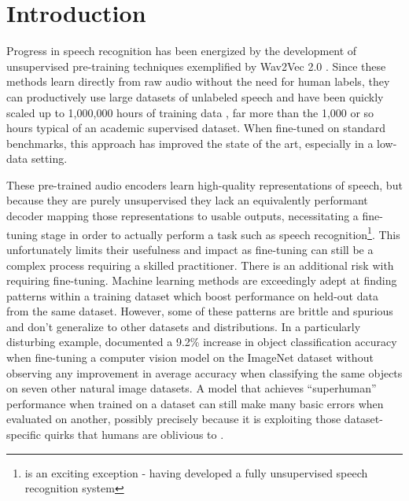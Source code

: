 \documentclass[nohyperref]{article}
\theoremstyle{plain}
\theoremstyle{definition}
\theoremstyle{remark}
\begin{document}
\begin{abstract}
We study the capabilities of speech processing systems trained simply to predict large amounts of transcripts of audio on the internet. When scaled to 680,000 hours of multilingual and multitask supervision, the resulting models generalize well to standard benchmarks and are often competitive with prior fully supervised results but in a zero-shot transfer setting without the need for any fine-tuning. When compared to humans, the models approach their accuracy and robustness. We are releasing models and inference code to serve as a foundation for further work on robust speech processing.
\end{abstract}

\section{Introduction}\label{sec:introduction}

Progress in speech recognition has been energized by the development of unsupervised pre-training techniques exemplified by Wav2Vec 2.0 \cite{baevski2020wav2vec2}. Since these methods learn directly from raw audio without the need for human labels, they can productively use large datasets of unlabeled speech and have been quickly scaled up to 1,000,000 hours of training data \cite{zhang2021bigssl}, far more than the 1,000 or so hours typical of an academic supervised dataset. When fine-tuned on standard benchmarks, this approach has improved the state of the art, especially in a low-data setting.

These pre-trained audio encoders learn high-quality representations of speech, but because they are purely unsupervised they lack an equivalently performant decoder mapping those representations to usable outputs, necessitating a fine-tuning stage in order to actually perform a task such as speech recognition\footnote{\citet{baevski2021unsupervised} is an exciting exception - having developed a fully unsupervised speech recognition system}. This unfortunately limits their usefulness and impact as fine-tuning can still be a complex process requiring a skilled practitioner. There is an additional risk with requiring fine-tuning. Machine learning methods are exceedingly adept at finding patterns within a training dataset which boost performance on held-out data from the same dataset. However, some of these patterns are brittle and spurious and don't generalize to other datasets and distributions. In a particularly disturbing example, \citet{radford2021clip} documented a 9.2\% increase in object classification accuracy when fine-tuning a computer vision model on the ImageNet dataset \cite{russakovsky2015imagenet} without observing any improvement in average accuracy when classifying the same objects on seven other natural image datasets. A model that achieves ``superhuman'' performance when trained on a dataset can still make many basic errors when evaluated on another, possibly precisely because it is exploiting those dataset-specific quirks that humans are oblivious to \cite{geirhos2020shortcut}.
\end{document}
